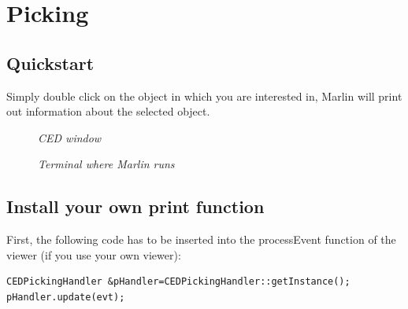 \documentclass[a4paper,10pt]{article}
\begin{document}
\section{Picking}
\subsection{Quickstart}
Simply double click on the object in which you are interested in, Marlin will print out information about the selected object. 
\begin{figure}[h!]
\begin{minipage}[t]{6cm}
\setlength{\fboxsep}{0mm}
\centerline{}
\caption{\label{CEDViewer} \textsl{CED window}}
\end{minipage}
\hfill
\begin{minipage}[t]{6cm}
\setlength{\fboxsep}{0mm}
\centerline{}
\caption{\label{DSTViewer}\textsl{Terminal where Marlin runs}}
\end{minipage}
\end{figure}
 

\subsection{Install your own print function}\label{own_picking}
First, the following code has to be inserted into the processEvent function of the viewer (if you use your own viewer):
\begin{verbatim}
CEDPickingHandler &pHandler=CEDPickingHandler::getInstance();
pHandler.update(evt);
\end{verbatim}
\end{document}
